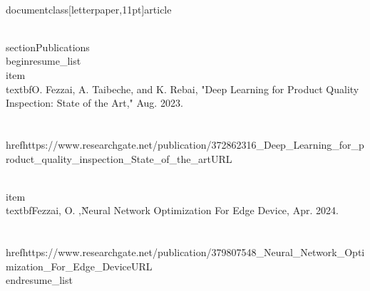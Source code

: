\\documentclass[letterpaper,11pt]{article}
\begin{document}
\\section{Publications}
\\begin{resume_list}
  \\item \\textbf{O. Fezzai, A. Taibeche, and K. Rebai, "Deep Learning for Product Quality Inspection: State of the Art," Aug. 2023.} \\\\
    \\href{https://www.researchgate.net/publication/372862316_Deep_Learning_for_product_quality_inspection_State_of_the_art}{URL}
    
  \\item \\textbf{Fezzai, O. ,\"Neural Network Optimization For Edge Device,} Apr. 2024. \\\\
    \\href{https://www.researchgate.net/publication/379807548_Neural_Network_Optimization_For_Edge_Device}{URL}
\\end{resume_list}
\end{document}
